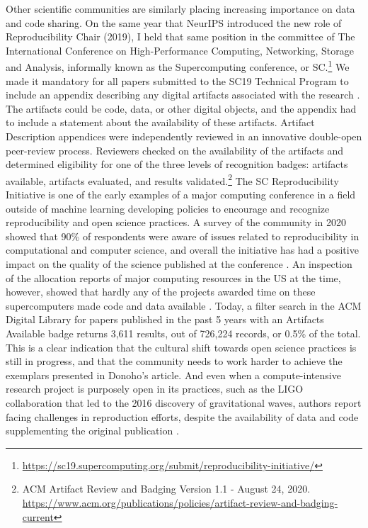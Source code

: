 \documentclass[]{hdsr}
\begin{document}
Other scientific communities are similarly placing increasing importance on data and code sharing. On the same year that NeurIPS introduced the new role of Reproducibility Chair (2019), I held that same position in the committee of The International Conference on High-Performance Computing, Networking, Storage and Analysis, informally known as the Supercomputing conference, or SC.\footnote{\url{https://sc19.supercomputing.org/submit/reproducibility-initiative/}} We made it mandatory for all papers submitted to the SC19 Technical Program to include an appendix describing any digital artifacts associated with the research \citep{barba2021trustworthy}. The artifacts could be code, data, or other digital objects, and the appendix had to include a statement about the availability of these artifacts. 
Artifact Description appendices were independently reviewed in an innovative double-open peer-review process. Reviewers checked on the availability of the artifacts and determined eligibility for one of the three levels of recognition badges: artifacts available, artifacts evaluated, and results validated.\footnote{ACM Artifact Review and Badging Version 1.1 - August 24, 2020. \url{https://www.acm.org/publications/policies/artifact-review-and-badging-current}}
The SC Reproducibility Initiative is one of the early examples of a major computing conference in a field outside of machine learning developing policies to encourage and recognize reproducibility and open science practices. A survey of the community in 2020 showed that 90\% of respondents were aware of issues related to reproducibility in computational and computer science, and overall the initiative has had a positive impact on the quality of the science published at the conference \citep{plale2021reproducibility}.
An inspection of the allocation reports of major computing resources in the US at the time, however, showed that hardly any of the projects awarded time on these supercomputers made code and data available \citep{barba2021trustworthy}.
Today, a filter search in the ACM Digital Library for papers published in the past 5 years with an Artifacts Available badge returns 3,611 results, out of 726,224 records, or 0.5\% of the total.
This is a clear indication that the cultural shift towards open science practices is still in progress, and that the community needs to work harder to achieve the exemplars presented in Donoho's article.
And even when a compute-intensive research project is purposely open in its practices, such as the LIGO collaboration that led to the 2016 discovery of gravitational waves, authors report facing challenges in reproduction efforts, despite the availability of data and code supplementing the original publication \citep{brown2021reproducing}.
\end{document}
